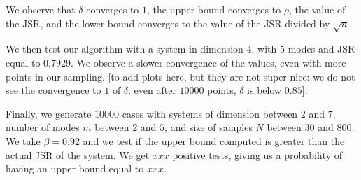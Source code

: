 We observe that $\delta$ converges to $1$, the upper-bound converges to $\rho$, the value of the JSR, and the lower-bound converges to the value of the JSR divided by $\sqrt{n}$.

We then test our algorithm with a system in dimension $4$, with $5$ modes and JSR equal to $0.7929$. We observe a slower convergence of the values, even with more points in our sampling.
[to add plots here, but they are not super nice: we do not see the convergence to $1$ of $\delta$: even after $10 000$ points, $\delta$ is below $0.85$].

Finally, we generate $10000$ cases with systems of dimension between $2$ and $7$, number of modes $m$ between $2$ and $5$, and size of samples $N$ between $30$ and $800$. We take $\beta = 0.92$ and we test if the upper bound computed is greater than the actual JSR of the system. We get $xxx$ positive tests, giving us a probability of having an upper bound equal to $xxx$. 



